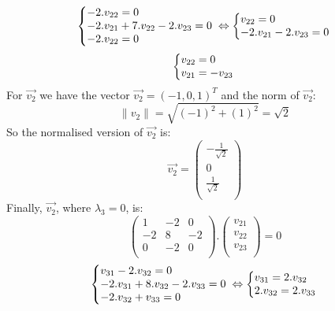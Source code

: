 \documentclass[a4,12pt,twosided,openany]{memoir}
\begin{document}
\[  \left\{\begin{array}{@{}l@{}}
   -2.v_{22} = 0\\
   -2.v_{21} + 7.v_{22}-2.v_{23} = 0\\
   -2.v_{22} = 0\\
  \end{array}\right.\,
   \Leftrightarrow
  \left\{\begin{array}{@{}l@{}}
   v_{22} = 0\\
  -2.v_{21} -2.v_{23} = 0\\
  \end{array}\right.\,
\]
\[  \left\{\begin{array}{@{}l@{}}
   v_{22} = 0\\
   v_{21} = -v_{23}\\
  \end{array}\right.\,
\]
For $\overrightarrow{v_2}$ we have the vector $\overrightarrow{v_2} = (-1,0,1)^T$ and the norm of $\overrightarrow{v_2}$:
\[\| v_2 \| = \sqrt{(-1)^2  + (1)^2} = \sqrt{2}\]
So the normalised version of $\overrightarrow{v_2}$ is: 
\[
\overrightarrow{v_2}  = \begin{pmatrix}
-\frac{1}{\sqrt{2}}\\
0\\
\frac{1}{\sqrt{2}}\\
\end{pmatrix}
\]
Finally, $\overrightarrow{v_2}$, where $\lambda_3 = 0$, is:
\[
\begin{pmatrix}
1 & -2 & 0 \\
-2 & 8 & -2 \\
0 & -2 & 0 \\
\end{pmatrix}.
\begin{pmatrix}
v_{21}\\
v_{22}\\
v_{23} \\
\end{pmatrix} = 0 
\] 
\[
  \left\{\begin{array}{@{}l@{}}
   v_{31} -2.v_{32} = 0\\
   -2.v_{31} + 8.v_{32}-2.v_{33} = 0\\
   -2.v_{32} + v_{33}  = 0\\
  \end{array}\right.\,
   \Leftrightarrow
  \left\{\begin{array}{@{}l@{}}
   v_{31} = 2.v_{32}\\
   2.v_{32} =2.v_{33}\\
  \end{array}\right.\,
\]
\end{document}
